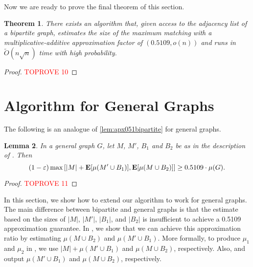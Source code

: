 \documentclass[letterpaper,11pt]{article}
\renewcommand{\epsilon}{\varepsilon}
\DeclareMathOperator{\E}{\ensuremath{\normalfont \textbf{E}}}
\newtheorem{lemma}{Lemma}[section]
\newtheorem{theorem}[lemma]{Theorem}
\begin{document}
Now we are ready to prove the final theorem of this section.

\begin{theorem}
    There exists an algorithm that, given access to the adjacency list of a bipartite graph, estimates the size of the maximum matching with a multiplicative-additive approximation factor of $(0.5109, o(n))$ and runs in $\widetilde{O}(n\sqrt{n})$ time with high probability.
\end{theorem}
\begin{proof}\textcolor{red}{TOPROVE 10}\end{proof}















 










\section{Algorithm for General Graphs}\label{sec:general}

The following is an analogue of \cref{lem:apx051bipartite} for general graphs.
\begin{lemma} \label{lem:apx051general}
    In a general graph $G$,
    let $M$, $M'$, $B_1$ and $B_2$ be as in the description of . Then
    \[(1-\epsilon)\max \left[|M| + \E[\mu(M' \cup B_1)], \E[\mu(M \cup B_2)] \right] \geq 0.5109  \cdot\mu(G) .\]
\end{lemma}
\begin{proof}\textcolor{red}{TOPROVE 11}\end{proof}

In this section, we show how to extend our algorithm to work for general graphs. The main difference between bipartite and general graphs is that the estimate based on the sizes of $|M|$, $|M'|$, $|B_1|$, and $|B_2|$ is insufficient to achieve a 0.5109 approximation guarantee. In , we show that we can achieve this approximation ratio by estimating $\mu(M \cup B_2)$ and $\mu(M' \cup B_1)$. More formally, to produce $\mu_1$ and $\mu_2$ in , we use $|M| + \mu(M' \cup B_1)$ and $\mu(M \cup B_2)$, respectively. Also,  and  output $\mu(M' \cup B_1)$ and $\mu(M \cup B_2)$, respectively.
\end{document}
